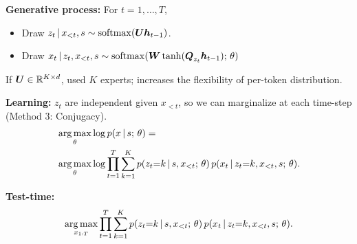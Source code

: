 \begin{frame}

\textbf{Generative process:} For $t=1, \ldots, T$,
\begin{itemize}
    \item Draw $z_{t} \,|\, x_{< t}, s \sim \operatorname*{softmax}(\boldsymbol{U} \boldsymbol{h}_{t-1})$.
    \item Draw $x_{t} \,|\, z_{t}, x_{< t}, s \sim \operatorname*{softmax}(\boldsymbol{W} \tanh(\boldsymbol{Q}_{z_t} \boldsymbol{h}_{t-1}) ; \, \theta)$ %
\end{itemize}
\begin{center}

\end{center}
\air 
\air
If $\boldsymbol{U} \in \mathbb{R}^{K \times d}$, used $K$ experts; increases the flexibility of per-token distribution.

\end{frame}

\begin{frame}
\textbf{Learning:} $z_t$ are independent given $x_{<t}$, so we can marginalize at each time-step (Method 3: Conjugacy).
    \begin{align*}
        &\argmax_{\theta} \log p(x \given s \param \theta) =  \\
        &\argmax_{\theta} \log \prod_{t=1}^T \sum_{k=1}^K p(z_t {=} k \given s, x_{<t} \param \theta) \, p(x_t \given z_t{=}k, x_{<t}, s \param \theta).
    \end{align*}

\textbf{Test-time:}
\begin{align*}
\argmax_{x_{1:T}} \prod_{t=1}^T \sum_{k=1}^K p(z_t {=} k \given s, x_{<t} \param \theta) \, p(x_t \given z_t{=}k, x_{<t}, s \param \theta).
\end{align*}
\end{frame}

